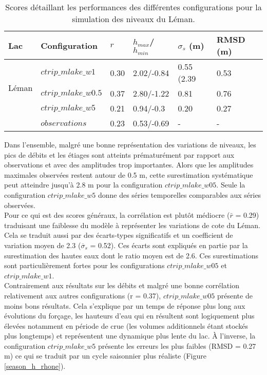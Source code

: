 \begin{table}[h!]
	\caption{Scores détaillant les performances des différentes configurations pour la simulation des niveaux du Léman.}
	\label{tab:level_metrics_rhone}
	\centering
	\begin{tabularx}{\textwidth}{p{2cm}p{3cm}p{1cm}p{2cm}p{2cm}p{2cm}}
               \hline
		Lac & Configuration&$r$&$h_{max}$/$h_{min}$&$\sigma_{s}$ (m) &RMSD (m) \\
               \hline
                \multirow{3}{4cm}{Léman}&\footnotesize{$ctrip\_mlake\_w1$}&0.30&2.02/-0.84&0.55 (2.39&0.53\\
		&\footnotesize{$ctrip\_mlake\_w0.5$}&0.37&2.80/-1.22&0.81 &0.76\\
		&\footnotesize{$ctrip\_mlake\_w5$}&0.21&0.94/-0.3&0.20 &0.27\\
		&\footnotesize{$observations$}&0.23&0.53/-0.69&-&-\\
               \hline
	\end{tabularx}
\end{table} 

\noindent Dans l'ensemble, malgré une bonne représentation des variations de niveaux, les pics de débits et les étiages sont atteints prématurément par rapport aux observations et avec des amplitudes trop importantes. Alors que les amplitudes maximales observées restent autour de 0.5 m, cette surestimation systématique peut atteindre jusqu'à 2.8 m pour la configuration $ctrip\_mlake\_w05$. Seule la configuration $ctrip\_mlake\_w5$ donne des séries temporelles comparables aux séries observées.\\
Pour ce qui est des scores généraux, la corrélation est plutôt médiocre ($\bar{r}$ = 0.29) traduisant une faiblesse du modèle à représenter les variations de cote du Léman. Cela se traduit aussi par des écarts-types significatifs et un coefficient de variation moyen de 2.3 ($\overline{\sigma}_{s}$ = 0.52). Ces écarts sont expliqués en partie par la surestimation des hautes eaux dont le ratio moyen est de 2.6. Ces surestimations sont particulièrement fortes pour les configurations $ctrip\_mlake\_w05$ et $ctrip\_mlake\_w1$.\\

Contrairement aux résultats sur les débits et malgré une bonne corrélation relativement aux autres configurations (r = 0.37), $ctrip\_mlake\_w05$ présente de moins bons résultats. Cela s'explique par un temps de réponse plus long aux évolutions du forçage, les hauteurs d'eau qui en résultent sont logiquement plus élevées notamment en période de crue (les volumes additionnels étant stockés plus longtemps) et représentent une dynamique plus lente du lac. À l'inverse, la configuration $ctrip\_mlake\_w5$ présente les erreurs les plus faibles (RMSD = 0.27 m) ce qui se traduit par un cycle saisonnier plus réaliste (Figure \ref{season_h_rhone}).

